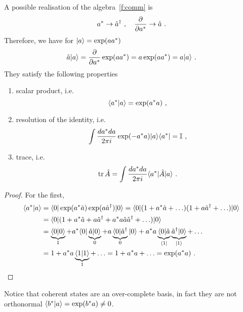     A possible realisation of the algebra~\eqref{f:comm} is 
    \begin{equation*}
        a^* \rightarrow \hat a^\dagger  ~, \quad \frac{\partial}{\partial a^*} \rightarrow \hat a ~.
    \end{equation*}
    Therefore, we have for $\vert a\rangle = \exp(a a^*)$
    \begin{equation*}
        \hat a \vert a\rangle = \frac{\partial}{\partial a^*} \exp(a a^*) = a \exp(a a^*) = a \vert a\rangle ~.
    \end{equation*}
    They satisfy the following properties
    \begin{enumerate}
        \item scalar product, i.e.
            \begin{equation*}
                \langle a^*\vert a\rangle = \exp(a^* a) ~,
            \end{equation*}
        \item resolution of the identity, i.e. 
            \begin{equation*}
                \int \frac{da^* da}{2 \pi i} \exp(- a^* a) \vert a\rangle \langle a^*\vert = \mathbb I ~,
            \end{equation*}
        \item trace, i.e. 
            \begin{equation*}
                \operatorname{tr} \hat A = \int \frac{da^* da}{2 \pi i} \langle a^*\vert \hat A \vert a\rangle ~.
            \end{equation*}
    \end{enumerate}
    \begin{proof}
        For the first, 
        \begin{equation*}
        \begin{aligned}
            \langle a^*\vert a\rangle & = \langle0\vert \exp(a^* \hat a) \exp(a \hat a^\dagger) \vert0\rangle = \langle0\vert (1 + a^* \hat a + \ldots) (1 + a \hat a^\dagger + \ldots) \vert0\rangle \\ & =  \langle0\vert (1 + a^* \hat a + a \hat a^\dagger + a^* a \hat a \hat a^\dagger + \ldots ) \vert0\rangle \\ & = \underbrace{\langle0\vert0\rangle}_1 + a^* \langle0\vert \underbrace{\hat a \vert0\rangle}_0 + a \underbrace{\langle0\vert \hat a^\dagger}_0 \vert0\rangle + a^* a \underbrace{\langle0\vert \hat a}_{\langle1\vert} \underbrace{\hat a^\dagger \vert0\rangle}_{\vert1\rangle} + \ldots \\ & = 1 + a^* a \underbrace{\langle1\vert1\rangle}_1 + \ldots = 1 + a^* a + \ldots = \exp(a^* a) ~.
        \end{aligned}
        \end{equation*}
    \end{proof}
    Notice that coherent states are an over-complete basis, in fact they are not orthonormal $\langle b^*\vert a\rangle = \exp(b^* a) \neq 0$.

